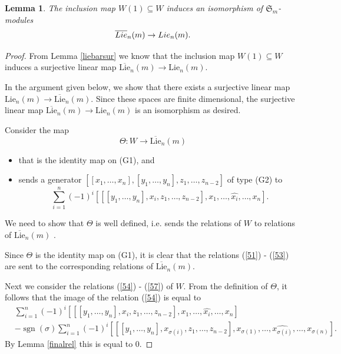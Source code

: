 \documentclass[10pt,a4paper]{amsart}
\newtheorem{lem}{Lemma}
\DeclareMathOperator{\sign}{sgn}
\begin{document}
\begin{lem}\label{presentationlanke} The inclusion map $W(1) \subseteq W$ induces an isomorphism of $\mathfrak{S}_m$-modules \[\overline{\textup{Lie}}_n(m) \to \textup{Lie}_n(m).\]
\end{lem}

\begin{proof}  From Lemma \ref{liebarsur} we know that the inclusion map $W(1) \subseteq W$ induces a surjective linear map  $ \overline{\text{Lie}}_n(m) \to \text{Lie}_n(m).$ 
	
	In the argument given below, we show that there exists a surjective linear map $\text{Lie}_n(m) \to \overline{\text{Lie}}_n(m)$. Since these spaces are finite dimensional, the surjective linear map $\overline{\text{Lie}}_n(m) \to \text{Lie}_n(m)$  is an isomorphism as desired.
	
	Consider the map \[ \Theta:W \to \overline{\text{Lie}}_n(m)\]  \begin{itemize}
		\item that is the identity map on (G1), and
		\item sends a generator $[[{x_1},\dots ,{x_n} ],[{y_{1}},\dots, y_{n}], z_{1},\dots ,z_{n-2}  ]$ of type (G2) to 
		\begin{equation}\label{ThetaG2}\sum_{i=1}^{n}(-1)^{i}[[[y_1,\dots,y_n],x_i , z_1,\dots, z_{n-2}],x_1,\dots,\widehat{x_{i}},\dots, x_n].\end{equation}
	\end{itemize}
	We need to show that $\Theta$ is well defined, i.e. sends the relations  of  $W$ to relations of $\overline{\text{Lie}}_n(m)$ .
	
	Since $\Theta$ is the identity map on (G1), it is clear that the relations (\ref{51}) - (\ref{53})  are sent to the corresponding relations of $\overline{\text{Lie}}_n(m)$.
	
	Next we consider the relations (\ref{54}) - (\ref{57}) of $W$. From the definition of $\Theta$, it follows that the image of the relation (\ref{54}) is equal to 
	\begin{align*}&\sum_{i=1}^n(-1)^i[[[y_1,\dots,y_n],x_i,z_1,\dots, z_{n-2}],x_1,\dots, \widehat{x_i}, \dots, x_n]\\&-\sign(\sigma)\sum_{i=1}^n(-1)^i[[[y_1,\dots,y_n],x_{\sigma(i)},z_1,\dots, z_{n-2}],x_{\sigma(1)},\dots, \widehat{x_{\sigma(i)}}, \dots, x_{\sigma(n)}].
	\end{align*}
	By Lemma \ref{finalrel} this is equal to $0$.
	

\end{proof}
\end{document}
